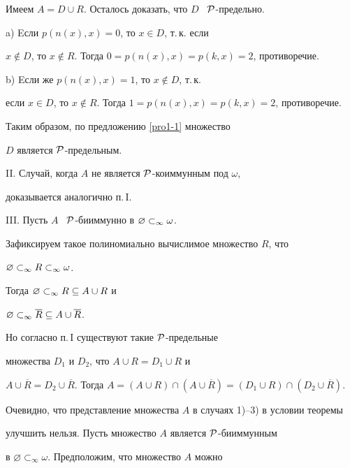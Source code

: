 \begin{pf}
Имеем $A=D\cup R$. Осталось доказать, что $D$ \ $\cal{P}$-предельно.





a) Eсли $p(n(x),x)=0$, то $x\in D$, т.\,к. если


$x\notin D$, то $x\notin R$. Тогда $0=p(n(x),x)=p(k,x)=2$, противоречие.





b) Eсли же $p(n(x),x)=1$, то $x\notin D$, т.\,к.


если $x\in D$, то $x\notin R$. Тогда $1=p(n(x),x)=p(k,x){=}2$, противоречие.





Таким образом, по предложению \ref{pro1-1} множество


$D$ является $\cal{P}$-предельным.





II. Случай, когда $A$ не является $\cal{P}$-коиммунным под $\omega$,


доказывается аналогично п.\,I.





III. Пусть $A$ \ $\cal{P}$-бииммунно в ${\varnothing}\subset_\infty{\omega}$.


Зафиксируем такое полиномиально вычислимое множество $R$, что


${\varnothing}\subset_\infty{{R}\subset_\infty{\omega}}$.


Тогда ${\varnothing}\subset_\infty{R\subseteq A\cup R}$ и


${\varnothing}\subset_\infty{\overline{R}\subseteq A\cup\overline{R}}$.


Но согласно п.\,I существуют такие $\cal{P}$-предельные


множества $D_1$ и $D_2$, что $A\cup R=D_1\cup R$ и


$A\cup\overline{R}=D_2\cup\overline{R}$. Тогда $A=(A\cup R)\cap(A\cup


\overline{R})=(D_1\cup R)\cap(D_2\cup\overline{R})$.





Очевидно, что представление множества $A$ в случаях 1)--3) в условии теоремы


улучшить нельзя. Пусть множество $A$ является $\cal{P}$-бииммунным


в $\varnothing\subset_\infty\omega$. Предположим, что множество $A$ можно



\end{pf}
